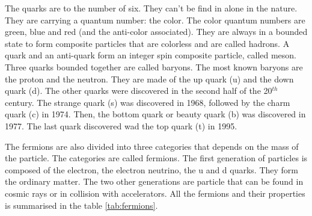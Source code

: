     The quarks are to the number of six.
    They can't be find in alone in the nature.
    They are carrying a quantum number: the color.
    The color quantum numbers are green, blue and red (and the anti-color associated).
    They are always in a bounded state to form composite particles that are colorless and are called hadrons.
    A quark and an anti-quark form an integer spin composite particle, called meson.
    Three quarks bounded together are called baryons. The most known baryons are the proton and the neutron.
    They are made of the up quark (u) and the down quark (d).
    The other quarks were discovered in the second half of the 20$^{th}$ century.
    The strange quark (s) was discovered in 1968, followed by the charm quark (c) in 1974.
    Then, the bottom quark or beauty quark (b) was discovered in 1977.
    The last quark discovered wad the top quark (t) in 1995.  

    The fermions are also divided into three categories that depends on the mass of the particle.
    The categories are called fermions.
    The first generation of particles is composed of the electron, the electron neutrino, the u and d quarks. 
    They form the ordinary matter.
    The two other generations are particle that can be found in cosmic rays or in collision with accelerators.
    All the fermions and their properties is summarised in the table \ref{tab:fermions}.

